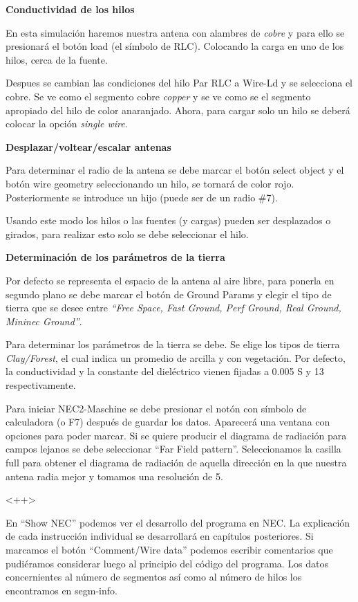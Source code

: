 \documentclass[12pt]{article}
\begin{document}
\textbf{Conductividad de los hilos}

En esta simulaci\'on haremos nuestra antena con alambres de \textit{cobre} y
para ello se presionar\'a el bot\'on load (el s\'imbolo de RLC). Colocando la
carga en uno de los hilos, cerca de la fuente.

Despues se cambian las condiciones del hilo Par RLC a Wire-Ld y se selecciona
el cobre. Se ve como el segmento cobre \textit{copper} y se ve como se el
segmento apropiado del hilo de color anaranjado. Ahora, para cargar solo un
hilo se deber\'a colocar la opci\'on \textit{single wire}. 

\textbf{Desplazar/voltear/escalar antenas}

Para determinar el radio de la antena se debe marcar el bot\'on  select object
y el bot\'on wire geometry seleccionando un hilo, se tornar\'a de color rojo.
Posteriormente se introduce un hijo (puede ser de un radio \#7).

Usando este modo los hilos o las fuentes (y cargas) pueden ser desplazados o
girados, para realizar esto solo se debe seleccionar el hilo.

\textbf{Determinaci\'on de los par\'ametros de la tierra}

Por defecto se representa el espacio de la antena al aire libre, para ponerla
en segundo plano se debe marcar el bot\'on de Ground Params y elegir el tipo de
tierra que se desee entre  \textit{``Free Space, Fast Ground, Perf Ground, Real
Ground, Mininec Ground''}.

Para determinar los par\'ametros de la tierra se debe. Se elige los tipos de
tierra \textit{Clay/Forest}, el cual indica un promedio de arcilla y con
vegetaci\'on. Por defecto, la conductividad y la constante del diel\'ectrico
vienen fijadas a 0.005 S y 13 respectivamente.

  

Para iniciar NEC2-Maschine se debe presionar el not\'on con s\'imbolo de
calculadora (o F7) despu\'es de guardar los datos. Aparecer\'a una ventana con
opciones para poder marcar. Si se quiere producir el diagrama de radiación para
campos lejanos se debe seleccionar ``Far Field pattern''. Seleccionamos la
casilla full para obtener el diagrama de radiación de aquella dirección en la
que nuestra antena radia mejor y tomamos una resolución de 5.

<++> 

En “Show NEC” podemos ver el desarrollo del programa en NEC. La explicación de
cada instrucción individual se desarrollar\'a en capítulos posteriores. Si
marcamos el botón ``Comment/Wire data'' podemos escribir comentarios que
pudiéramos considerar luego al principio del código del programa. Los datos
concernientes al número de segmentos así como al número de hilos los
encontramos en segm-info.
\end{document}
